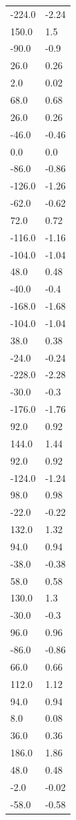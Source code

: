 \begin{longtable}{ll}
-224.0 & -2.24 \\
150.0 & 1.5 \\
-90.0 & -0.9 \\
26.0 & 0.26 \\
2.0 & 0.02 \\
68.0 & 0.68 \\
26.0 & 0.26 \\
-46.0 & -0.46 \\
0.0 & 0.0 \\
-86.0 & -0.86 \\
-126.0 & -1.26 \\
-62.0 & -0.62 \\
72.0 & 0.72 \\
-116.0 & -1.16 \\
-104.0 & -1.04 \\
48.0 & 0.48 \\
-40.0 & -0.4 \\
-168.0 & -1.68 \\
-104.0 & -1.04 \\
38.0 & 0.38 \\
-24.0 & -0.24 \\
-228.0 & -2.28 \\
-30.0 & -0.3 \\
-176.0 & -1.76 \\
92.0 & 0.92 \\
144.0 & 1.44 \\
92.0 & 0.92 \\
-124.0 & -1.24 \\
98.0 & 0.98 \\
-22.0 & -0.22 \\
132.0 & 1.32 \\
94.0 & 0.94 \\
-38.0 & -0.38 \\
58.0 & 0.58 \\
130.0 & 1.3 \\
-30.0 & -0.3 \\
96.0 & 0.96 \\
-86.0 & -0.86 \\
66.0 & 0.66 \\
112.0 & 1.12 \\
94.0 & 0.94 \\
8.0 & 0.08 \\
36.0 & 0.36 \\
186.0 & 1.86 \\
48.0 & 0.48 \\
-2.0 & -0.02 \\
-58.0 & -0.58 \\

\end{longtable}
